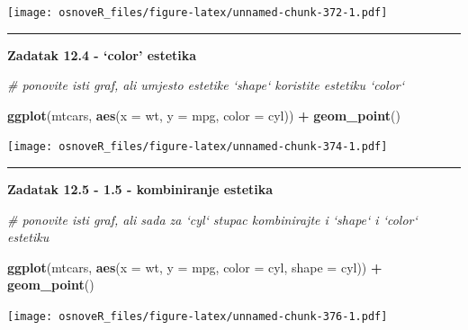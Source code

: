 \documentclass[]{book}
\newenvironment{Shaded}{\begin{snugshade}}{\end{snugshade}}
\newcommand{\KeywordTok}[1]{\textcolor[rgb]{0.13,0.29,0.53}{\textbf{#1}}}
\newcommand{\DataTypeTok}[1]{\textcolor[rgb]{0.13,0.29,0.53}{#1}}
\newcommand{\StringTok}[1]{\textcolor[rgb]{0.31,0.60,0.02}{#1}}
\newcommand{\CommentTok}[1]{\textcolor[rgb]{0.56,0.35,0.01}{\textit{#1}}}
\newcommand{\OperatorTok}[1]{\textcolor[rgb]{0.81,0.36,0.00}{\textbf{#1}}}
\newcommand{\NormalTok}[1]{#1}
\theoremstyle{definition}
\theoremstyle{definition}
\theoremstyle{definition}
\theoremstyle{remark}
\begin{document}
\texttt{[image: osnoveR\_files/figure-latex/unnamed-chunk-372-1.pdf]}

\begin{center}\rule{0.5\linewidth}{\linethickness}\end{center}

\textbf{Zadatak 12.4 - `color' estetika}

\begin{Shaded}
\begin{Highlighting}[]
\CommentTok{# ponovite isti graf, ali umjesto estetike `shape` koristite estetiku `color`}
\end{Highlighting}
\end{Shaded}

\begin{Shaded}
\begin{Highlighting}[]
\KeywordTok{ggplot}\NormalTok{(mtcars, }\KeywordTok{aes}\NormalTok{(}\DataTypeTok{x =}\NormalTok{ wt, }\DataTypeTok{y =}\NormalTok{ mpg, }\DataTypeTok{color =}\NormalTok{ cyl)) }\OperatorTok{+}\StringTok{ }\KeywordTok{geom_point}\NormalTok{()}
\end{Highlighting}
\end{Shaded}

\texttt{[image: osnoveR\_files/figure-latex/unnamed-chunk-374-1.pdf]}

\begin{center}\rule{0.5\linewidth}{\linethickness}\end{center}

\textbf{Zadatak 12.5 - 1.5 - kombiniranje estetika}

\begin{Shaded}
\begin{Highlighting}[]
\CommentTok{# ponovite isti graf, ali sada za `cyl` stupac kombinirajte i `shape` i `color` estetiku}
\end{Highlighting}
\end{Shaded}

\begin{Shaded}
\begin{Highlighting}[]
\KeywordTok{ggplot}\NormalTok{(mtcars, }\KeywordTok{aes}\NormalTok{(}\DataTypeTok{x =}\NormalTok{ wt, }\DataTypeTok{y =}\NormalTok{ mpg, }\DataTypeTok{color =}\NormalTok{ cyl, }\DataTypeTok{shape =}\NormalTok{ cyl)) }\OperatorTok{+}\StringTok{ }\KeywordTok{geom_point}\NormalTok{()}
\end{Highlighting}
\end{Shaded}

\texttt{[image: osnoveR\_files/figure-latex/unnamed-chunk-376-1.pdf]}
\end{document}
